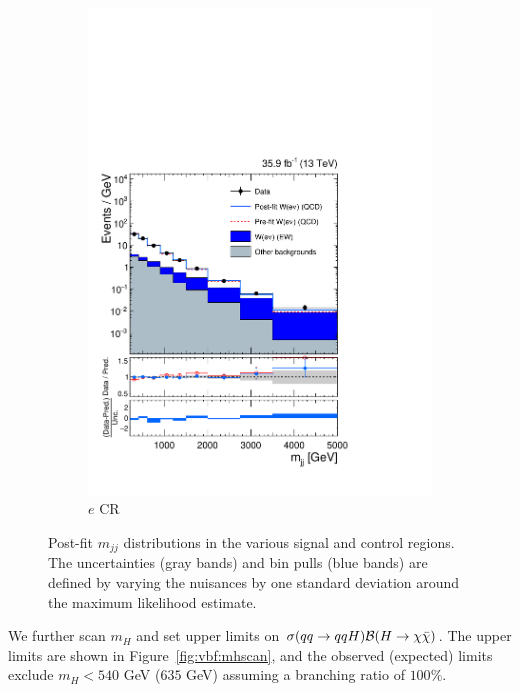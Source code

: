\begin{figure}[]
\begin{center}
\begin{subfigure}[t]{0.32\textwidth}
            \includegraphics[width=\textwidth]{figures/vbf/fits/vbf_PULLS_prefit_postfit_singleelectron.pdf}
            \caption{$e$ CR}
        \end{subfigure}
        \caption{Post-fit $m_{jj}$ distributions in the various signal and control regions.
                 The uncertainties (gray bands) and bin pulls (blue bands) are defined by varying the nuisances by one standard deviation around the maximum likelihood estimate.}
        \label{fig:vbf:postfit}
    \end{center}
\end{figure}

We further scan $m_H$ and set upper limits on $\sigma(qq\rightarrow qqH)\mathcal{B}(H\rightarrow\chi\bar\chi)$. 
The upper limits are shown in Figure~\ref{fig:vbf:mhscan}, and the observed (expected) limits exclude $m_H<540$ GeV ($635$ GeV) assuming a branching ratio of $100\%$. 

